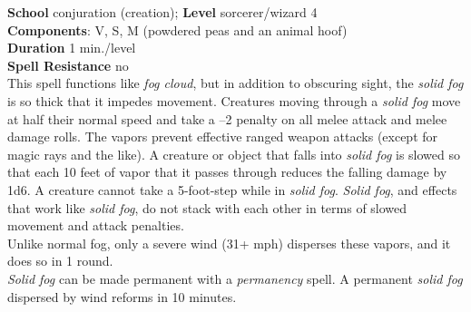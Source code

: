 \textbf{School} conjuration (creation); \textbf{Level} sorcerer/wizard 4\\
\textbf{Components}: V, S, M (powdered peas and an animal hoof)\\
\textbf{Duration} 1 min./level\\
\textbf{Spell Resistance} no\\
This spell functions like \textit{fog cloud}, but in addition to obscuring sight, the \textit{solid fog} is so thick that it impedes movement. Creatures moving through a \textit{solid fog} move at half their normal speed and take a --2 penalty on all melee attack and melee damage rolls. The vapors prevent effective ranged weapon attacks (except for magic rays and the like). A creature or object that falls into \textit{solid fog} is slowed so that each 10 feet of vapor that it passes through reduces the falling damage by 1d6. A creature cannot take a 5-foot-step while in \textit{solid fog}. \textit{Solid fog}, and effects that work like \textit{solid fog}, do not stack with each other in terms of slowed movement and attack penalties.\\
Unlike normal fog, only a severe wind (31+ mph) disperses these vapors, and it does so in 1 round.\\
\textit{Solid fog }can be made permanent with a \textit{permanency }spell. A permanent \textit{solid fog }dispersed by wind reforms in 10 minutes.\\
